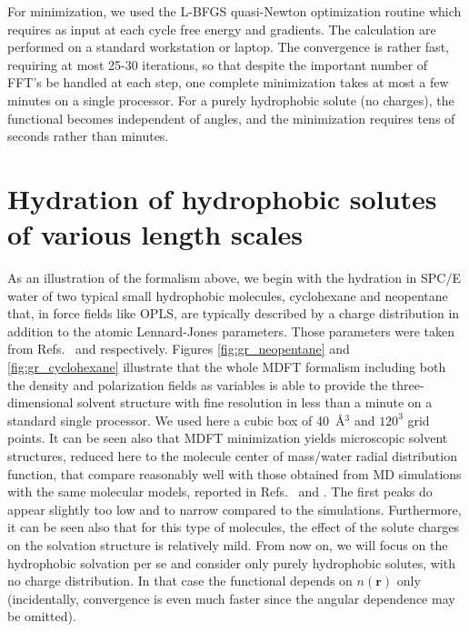 \documentclass[aip,jcp,showpacs,amsmath,amssymb,superscriptaddress]{revtex4-1}
\newcommand{\rr}{\mathbf{r}}
\begin{document}
For minimization, we used the L-BFGS quasi-Newton optimization routine\cite{BFGS} which requires as input at each cycle free energy and gradients.  The calculation are performed on  a standard  workstation or laptop. The convergence is rather fast, requiring at most 25-30 iterations, so that despite the important number of FFT's be handled at each step, one complete minimization takes at most a few minutes on a single processor.  For a purely hydrophobic solute (no charges), the functional becomes independent of angles,  and the minimization requires tens of seconds rather than minutes. 




\section{Hydration of hydrophobic solutes of various length scales}

As an illustration of the formalism above, we begin with the hydration in SPC/E water of two typical small hydrophobic molecules, cyclohexane and neopentane that, in force fields like OPLS, are typically described by a charge distribution in addition to the atomic Lennard-Jones parameters. Those parameters were taken from Refs.~ and  respectively. Figures \ref{fig:gr_neopentane} and \ref{fig:gr_cyclohexane} illustrate that the whole MDFT formalism including both the density and polarization fields as variables is able to provide the three-dimensional solvent structure with fine resolution in less than a minute on a standard single processor. We used here a cubic box of 40~\AA$^3$ and $120^3$ grid points. It can be seen also that MDFT minimization yields  microscopic solvent structures, reduced here to the molecule center of mass/water radial distribution function, that compare reasonably well with those obtained from MD simulations with the same molecular models, reported in  Refs.~ and . The first peaks do appear slightly too low and to narrow compared to the simulations. Furthermore, it can be seen also that for this type of molecules, the effect of the solute charges on the solvation structure is relatively mild. From now on, we will focus on the hydrophobic solvation per se and consider only purely hydrophobic solutes, with no charge distribution. In that case the functional depends on $n(\rr)$ only (incidentally, convergence is even much faster since the angular dependence may be omitted).   
\end{document}

